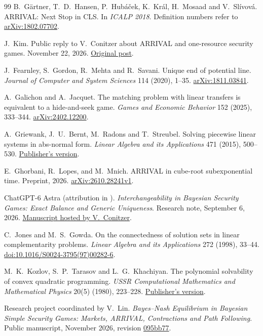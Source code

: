 \documentclass[11pt,oneside,openany,notitlepage]{report}
\begin{document}
\begin{thebibliography}{99}
B.~G\"artner, T.~D.~Hansen, P.~Hub\'a\v{c}ek, K.~Kr\'al, H.~Mosaad
and V.~Sl\'ivov\'a. ARRIVAL: Next Stop in CLS. In \emph{ICALP 2018}.
Definition numbers refer to \href{https://arxiv.org/abs/1802.07702}{arXiv:1802.07702}.

J.~Kim. Public reply to V.~Conitzer about ARRIVAL and one-resource
security games. November 22, 2026.
\href{https://x.com/JeonseongKim/status/2124443473428537685}{Original post}.

J.~Fearnley, S.~Gordon, R.~Mehta and R.~Savani.
Unique end of potential line. \emph{Journal of Computer and System Sciences}
114 (2020), 1--35.
\href{https://arxiv.org/abs/1811.03841}{arXiv:1811.03841}.

A.~Galichon and A.~Jacquet. The matching problem with linear transfers is
equivalent to a hide-and-seek game. \emph{Games and Economic Behavior}
152 (2025), 333--344.
\href{https://arxiv.org/abs/2402.12200}{arXiv:2402.12200}.

A.~Griewank, J.~U.~Bernt, M.~Radons and T.~Streubel.
Solving piecewise linear systems in abs-normal form.
\emph{Linear Algebra and its Applications} 471 (2015), 500--530.
\href{https://doi.org/10.1016/j.laa.2014.12.017}{Publisher's version}.

E.~Ghorbani, R.~Lopes, and M.~Mnich. ARRIVAL in cube-root subexponential
time. Preprint, 2026.
\href{https://arxiv.org/abs/2610.28241v1}{arXiv:2610.28241v1}.

ChatGPT-6 Astra (attribution in \cite{conitzer}).
\emph{Interchangeability in Bayesian Security Games: Exact Balance and
Generic Uniqueness}. Research note, September 6, 2026.
\href{https://www.cs.cmu.edu/~conitzer/gpt6interchangeability.pdf}{Manuscript hosted by V.~Conitzer}.

C.~Jones and M.~S.~Gowda. On the connectedness of solution sets in
linear complementarity problems. \emph{Linear Algebra and its Applications}
272 (1998), 33--44.
\href{https://doi.org/10.1016/S0024-3795(97)00282-6}{doi:10.1016/S0024-3795(97)00282-6}.

M.~K.~Kozlov, S.~P.~Tarasov and L.~G.~Khachiyan.
The polynomial solvability of convex quadratic programming.
\emph{USSR Computational Mathematics and Mathematical Physics}
20(5) (1980), 223--228.
\href{https://doi.org/10.1016/0041-5553(80)90098-1}{Publisher's version}.

Research project coordinated by V.~Lin. \emph{Bayes--Nash Equilibrium in
Bayesian Simple Security Games: Markets, ARRIVAL, Contractions and Path
Following}. Public manuscript, November 2026, revision
\href{https://github.com/vvncent/bayes-nash-equilibrium-simple-security-games/blob/095bb77fb6f15406d01f1ed2c8cb8038328f100b/main.pdf}{095bb77}.


\end{thebibliography}
\end{document}
